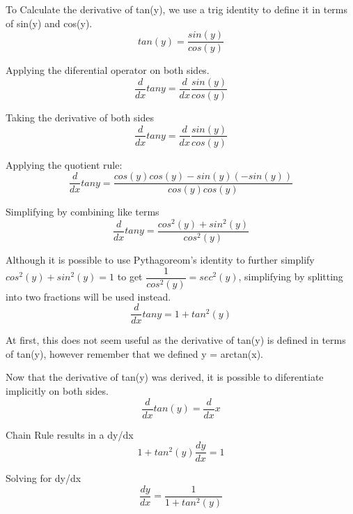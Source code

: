 \documentclass[12pt, titlepage]{article}
\begin{document}
To Calculate the derivative of tan(y), we use a trig identity to define it in terms of sin(y) and cos(y).
\begin{equation}
 tan(y) = \frac{sin(y)}{cos(y)}
\end{equation}

Applying the diferential operator on both sides.
\begin{equation}
  \frac{d}{dx} tany = \frac{d}{dx} \frac{sin(y)}{cos(y)}
\end{equation}

Taking the derivative of both sides
\begin{equation}
  \frac{d}{dx} tany = \frac{d}{dx} \frac{sin(y)}{cos(y)}
\end{equation}

Applying the quotient rule:
\begin{equation}
  \frac{d}{dx} tany = \frac{cos(y)cos(y) - sin(y)(-sin(y))}{cos(y)cos(y)}
\end{equation}

Simplifying by combining like terms
\begin{equation}
  \frac{d}{dx} tany = \frac{cos^{2}(y) + sin^{2}(y)}{cos^{2}(y)}
\end{equation}

Although it is possible to use Pythagoreom's identity to further simplify \(cos^{2}(y) + sin^{2}(y) = 1\) to get \(\dfrac{1}{cos^{2}(y)} = sec^{2}(y)\), simplifying by splitting into two fractions will be used instead. 
\begin{equation}
  \frac{d}{dx} tany = 1 + tan^{2}(y)
\end{equation}

At first, this does not seem useful as the derivative of tan(y) is defined in terms of tan(y), however remember that we defined y = arctan(x).

Now that the derivative of tan(y) was derived, it is possible to diferentiate implicitly on both sides.
\begin{equation}
 \frac{d}{dx} tan(y) = \frac{d}{dx} x
\end{equation}

Chain Rule results in a dy/dx
\begin{equation}
 1 + tan^{2}(y) \frac{dy}{dx}  = 1
\end{equation}

Solving for dy/dx
\begin{equation}
 \frac{dy}{dx}  = \frac{1}{1 + tan^{2}(y)}
\end{equation}
\end{document}
